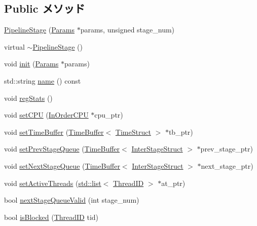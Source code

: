 \subsection*{Public メソッド}
\begin{DoxyCompactItemize}
\item 
\hyperlink{classPipelineStage_a30721921ff32a2c7bc0e01c472c8c935}{PipelineStage} (\hyperlink{classPipelineStage_aa14874985381292db0aea05d1c8a122c}{Params} $\ast$params, unsigned stage\_\-num)
\item 
virtual \hyperlink{classPipelineStage_a5045b86dad0c4a626861dc2aa1c59180}{$\sim$PipelineStage} ()
\item 
void \hyperlink{classPipelineStage_a66db401ca5ea7de9fe7ca057d5eeb53c}{init} (\hyperlink{classPipelineStage_aa14874985381292db0aea05d1c8a122c}{Params} $\ast$params)
\item 
std::string \hyperlink{classPipelineStage_a37627d5d5bba7f4a8690c71c2ab3cb07}{name} () const 
\item 
void \hyperlink{classPipelineStage_a4dc637449366fcdfc4e764cdf12d9b11}{regStats} ()
\item 
void \hyperlink{classPipelineStage_a6fd0f914e19bcfb6d9f28e537ad956d5}{setCPU} (\hyperlink{classInOrderCPU}{InOrderCPU} $\ast$cpu\_\-ptr)
\item 
void \hyperlink{classPipelineStage_a2b521ea5f191fff72265f60d4ed5187b}{setTimeBuffer} (\hyperlink{classTimeBuffer}{TimeBuffer}$<$ \hyperlink{structTimeStruct}{TimeStruct} $>$ $\ast$tb\_\-ptr)
\item 
void \hyperlink{classPipelineStage_aff9a9995beb69e92bbcf40c780c17b93}{setPrevStageQueue} (\hyperlink{classTimeBuffer}{TimeBuffer}$<$ \hyperlink{structInterStageStruct}{InterStageStruct} $>$ $\ast$prev\_\-stage\_\-ptr)
\item 
void \hyperlink{classPipelineStage_ace33f1daf903e9438330807405092e20}{setNextStageQueue} (\hyperlink{classTimeBuffer}{TimeBuffer}$<$ \hyperlink{structInterStageStruct}{InterStageStruct} $>$ $\ast$next\_\-stage\_\-ptr)
\item 
void \hyperlink{classPipelineStage_aab96bdacf8bd420402cbb543f994e054}{setActiveThreads} (\hyperlink{classstd_1_1list}{std::list}$<$ \hyperlink{base_2types_8hh_ab39b1a4f9dad884694c7a74ed69e6a6b}{ThreadID} $>$ $\ast$at\_\-ptr)
\item 
bool \hyperlink{classPipelineStage_ab6e550d3e889847f642fa2205c6e12fd}{nextStageQueueValid} (int stage\_\-num)
\item 
bool \hyperlink{classPipelineStage_ab8e0f4a73d5a3ab9fe269f3c36d97e4f}{isBlocked} (\hyperlink{base_2types_8hh_ab39b1a4f9dad884694c7a74ed69e6a6b}{ThreadID} tid)

\end{DoxyCompactItemize}
